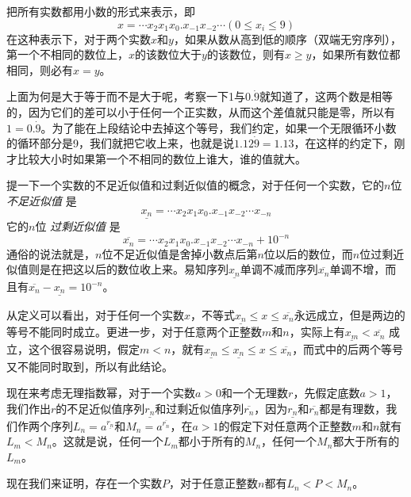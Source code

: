 把所有实数都用小数的形式来表示，即
\begin{equation}
  \label{eq:decimal-expression-of-real}
x=\cdots x_2x_1x_0.x_{-1}x_{-2}\cdots(0 \leqslant x_i \leqslant 9)
\end{equation}
在这种表示下，对于两个实数$x$和$y$，如果从数从高到低的顺序（双端无穷序列），第一个不相同的数位上，$x$的该数位大于$y$的该数位，则有$x \geqslant y$，如果所有数位都相同，则必有$x=y$。

上面为何是大于等于而不是大于呢，考察一下1与$0.\dot{9}$就知道了，这两个数是相等的，因为它们的差可以小于任何一个正实数，从而这个差值就只能是零，所以有$1=0.\dot{9}$。为了能在上段结论中去掉这个等号，我们约定，如果一个无限循环小数的循环部分是9，我们就把它收上来，也就是说$1.12\dot{9}=1.13$，在这样的约定下，刚才比较大小时如果第一个不相同的数位上谁大，谁的值就大。

提一下一个实数的不足近似值和过剩近似值的概念，对于任何一个实数，它的$n$位 \emph{不足近似值} 是
\begin{equation}
  \label{eq:lower-approximate-value-nth}
\underline{x_n}=\cdots x_2x_1x_0.x_{-1}x_{-2}\cdots x_{-n}
\end{equation}
它的$n$位 \emph{过剩近似值} 是
\begin{equation}
  \label{eq:upper-approximate-value-nth}
\overline{x_n}=\cdots x_2x_1x_0.x_{-1}x_{-2}\cdots x_{-n} + 10^{-n}
\end{equation}
通俗的说法就是，$n$位不足近似值是舍掉小数点后第$n$位以后的数位，而$n$位过剩近似值则是在把这以后的数位收上来。易知序列$\underline{x_n}$单调不减而序列$\overline{x_n}$单调不增，而且有$\overline{x_n}-\underline{x_n}=10^{-n}$。

从定义可以看出，对于任何一个实数$x$，不等式$\underline{x_n} \leqslant x \leqslant \overline{x_n}$永远成立，但是两边的等号不能同时成立。更进一步，对于任意两个正整数$m$和$n$，实际上有$\underline{x_m} < \overline{x_n}$ 成立，这个很容易说明，假定$m<n$，就有$\underline{x_m} \leqslant \underline{x_n} \leqslant x \leqslant \overline{x_n}$，而式中的后两个等号又不能同时取到，所以有此结论。

现在来考虑无理指数幂，对于一个实数$a>0$和一个无理数$r$，先假定底数$a>1$，我们作出$r$的不足近似值序列$\underline{r_n}$和过剩近似值序列$\overline{r_n}$，因为$\underline{r_n}$和$\overline{r_n}$都是有理数，我们作两个序列$L_n=a^{\underline{r_n}}$和$M_n=a^{\overline{r_n}}$，在$a>1$的假定下对任意两个正整数$m$和$n$就有$L_m<M_n$。这就是说，任何一个$L_m$都小于所有的$M_n$，任何一个$M_n$都大于所有的$L_m$。

现在我们来证明，存在一个实数$P$，对于任意正整数$n$都有$L_n<P<M_n$。

